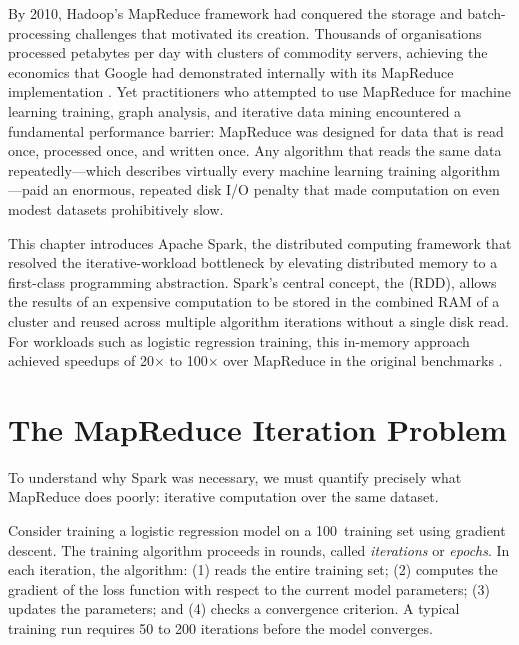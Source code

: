 \bigskip

By 2010, Hadoop's MapReduce framework had conquered the storage and
batch-processing challenges that motivated its creation. Thousands of
organisations processed petabytes per day with clusters of commodity
servers, achieving the economics that Google had demonstrated internally
with its MapReduce implementation \parencite{MapReduce2004}. Yet
practitioners who attempted to use MapReduce for machine learning training,
graph analysis, and iterative data mining encountered a fundamental
performance barrier: MapReduce was designed for data that is read once,
processed once, and written once. Any algorithm that reads the same data
repeatedly---which describes virtually every machine learning training
algorithm---paid an enormous, repeated disk I/O penalty that made
computation on even modest datasets prohibitively slow.

This chapter introduces Apache Spark, the distributed computing framework
that resolved the iterative-workload bottleneck by elevating distributed
memory to a first-class programming abstraction. Spark's central concept,
the  (RDD), allows the results of an
expensive computation to be stored in the combined RAM of a cluster and
reused across multiple algorithm iterations without a single disk read.
For workloads such as logistic regression training, this in-memory
approach achieved speedups of 20$\times$ to 100$\times$ over MapReduce
in the original benchmarks \parencite{RDD2012}.

\section{The MapReduce Iteration Problem}
\label{sec:mr-iteration}

To understand why Spark was necessary, we must quantify precisely what
MapReduce does poorly: iterative computation over the same dataset.

Consider training a logistic regression model on a 100\GB\ training set
using gradient descent. The training algorithm proceeds in rounds, called
\emph{iterations} or \emph{epochs}. In each iteration, the algorithm:
(1) reads the entire training set; (2) computes the gradient of the loss
function with respect to the current model parameters; (3) updates the
parameters; and (4) checks a convergence criterion. A typical training
run requires 50 to 200 iterations before the model converges.


